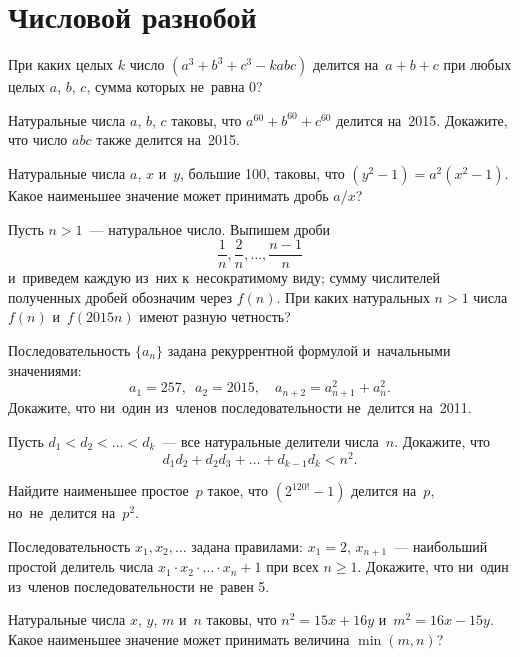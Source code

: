 
\section*{Числовой разнобой}


\begin{problems}

\item
При каких целых $k$ число $(a^3 + b^3 + c^3 - k a b c)$ делится на~$a + b + c$
при любых целых $a$, $b$, $c$, сумма которых не~равна 0?

\item
Натуральные числа $a$, $b$, $c$ таковы, что $a^{60} + b^{60} + c^{60}$ делится
на~2015.
Докажите, что число $a b c$ также делится на~2015.

\item
Натуральные числа $a$, $x$ и~$y$, большие 100, таковы, что
$(y^2 - 1) = a^2 (x^2 - 1)$.
Какое наименьшее значение может принимать дробь $a / x$?

\item
Пусть $n > 1$~--- натуральное число.
Выпишем дроби
\[
    \frac{1}{n}, \frac{2}{n}, \ldots, \frac{n - 1}{n}
\]
и~приведем каждую из~них к~несократимому виду;
сумму числителей полученных дробей обозначим через $f(n)$.
При каких натуральных $n > 1$ числа $f(n)$ и~$f(2015 n)$ имеют разную четность?

\item
Последовательность $\{ a_n \}$ задана рекуррентной формулой и~начальными
значениями:
\[
    a_1 = 257
,\enspace
    a_2 = 2015
,\quad
    a_{n+2} = a_{n+1}^2 + a_n^2
.\]
Докажите, что ни~один из~членов последовательности не~делится на~2011.

\item
Пусть $d_1 < d_2 < \ldots < d_k$~--- все натуральные делители числа~$n$.
Докажите, что
\[
    d_1 d_2 + d_2 d_3 + \ldots + d_{k-1} d_k < n^2
.\]

\item
Найдите наименьшее простое~$p$ такое, что $(2^{120!} - 1)$ делится на~$p$,
но~не~делится на~$p^2$.

\item
Последовательность $x_1, x_2, \ldots$ задана правилами: $x_1 = 2$,
$x_{n+1}$~--- наибольший простой делитель числа
\(
    x_1 \cdot x_2 \cdot \ldots \cdot x_{n} + 1
\)
при всех $n \geq 1$.
Докажите, что ни~один из~членов последовательности не~равен 5.

\item
Натуральные числа $x$, $y$, $m$ и~$n$ таковы, что
$n^2 = 15 x + 16 y$ и~$m^2 = 16 x - 15 y$.
Какое наименьшее значение может принимать величина $\min (m, n)$?

\end{problems}

